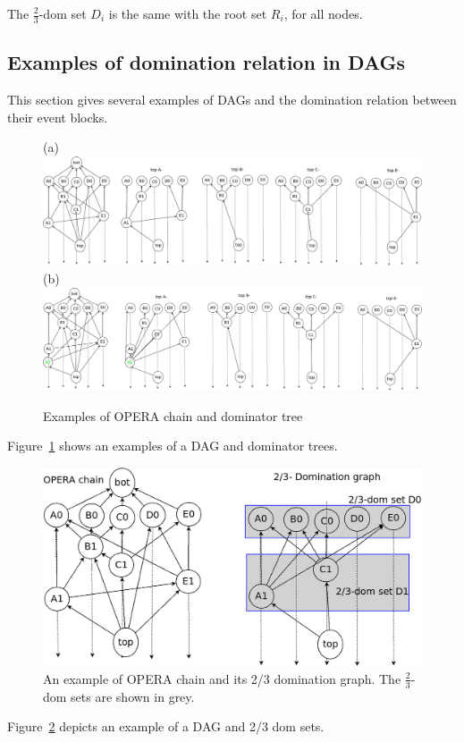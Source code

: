 \documentclass{article}
\begin{document}
The $\frac{2}{3}$-dom set $D_i$ is the same with the root set $R_i$, for all nodes.\\

\subsection{Examples of domination relation in DAGs}

This section gives several examples of DAGs and the domination relation between their event blocks.
\begin{figure}[h]
	\centering
	(a)\includegraphics[width=0.95\linewidth]{domtrees}\\
	(b)\includegraphics[width=0.95\linewidth]{domtrees_add1event}
	\caption{Examples of OPERA chain and dominator tree}
	\label{fig:domtrees1}
\end{figure}


Figure~\ref{fig:domtrees1} shows an examples of a DAG and dominator trees. 

\begin{figure}[H]
	\centering
	\includegraphics[width=0.5\linewidth]{domset}
	\caption{An example of OPERA chain and its 2/3 domination graph. The $\frac{2}{3}$-dom sets are shown in grey.}
	\label{fig:domset1}
\end{figure}

Figure~\ref{fig:domset1} depicts an example of a DAG and 2/3 dom sets.
\end{document}
